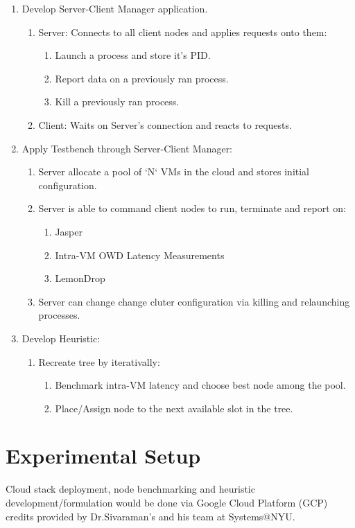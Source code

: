 \documentclass{article}
\begin{document}
\begin{enumerate}
    \item Develop Server-Client Manager application.
    \begin{enumerate}
        \item Server: Connects to all client nodes and applies requests onto them:
        \begin{enumerate}
            \item Launch a process and store it's PID.
            \item Report data on a previously ran process.
            \item Kill a previously ran process.
        \end{enumerate}
        \item Client: Waits on Server's connection and reacts to requests.
    \end{enumerate}
    \item Apply Testbench through Server-Client Manager:
    \begin{enumerate}
        \item Server allocate a pool of `N` VMs in the cloud and stores initial configuration.
        \item Server is able to command client nodes to run, terminate and report on:
        \begin{enumerate}
            \item Jasper
            \item Intra-VM OWD Latency Measurements
            \item LemonDrop
        \end{enumerate}
        \item Server can change change cluter configuration via killing and relaunching processes.
    \end{enumerate}
    \item Develop Heuristic:
    \begin{enumerate}
        \item Recreate tree by iterativally:
        \begin{enumerate}
            \item Benchmark intra-VM latency and choose best node among the pool.
            \item Place/Assign node to the next available slot in the tree.
        \end{enumerate}
    \end{enumerate}
\end{enumerate}

\section{Experimental Setup}
Cloud stack deployment, node benchmarking and heuristic development/formulation would be done 
via Google Cloud Platform (GCP) credits provided by Dr.Sivaraman's and his team at Systems@NYU.


    
\end{document}
